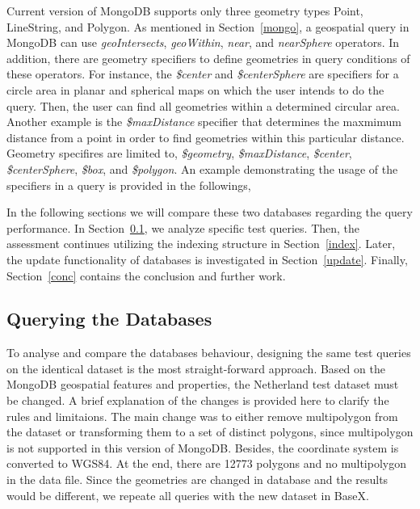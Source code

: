 \documentclass[a4paper,12pt]{article}
\begin{document}
Current version of MongoDB supports only three geometry types Point, LineString, and Polygon. As mentioned in Section~\ref{mongo}, a geospatial query in MongoDB can use \textit{geoIntersects}, \textit{geoWithin}, \textit{near}, and \textit{nearSphere} operators. In addition, there are geometry specifiers to define geometries in query conditions of these operators. For instance, the \textit{\$center} and \textit{\$centerSphere} are specifiers for a circle area in planar and spherical maps on which the user intends to do the query. Then, the user can find all geometries within a determined circular area. Another example is the \textit{\$maxDistance} specifier that determines the maxmimum distance from a point in order to find geometries within this particular distance. Geometry specifires are limited to, \textit{\$geometry}, \textit{\$maxDistance}, \textit{\$center}, \textit{\$centerSphere}, \textit{\$box}, and \textit{\$polygon}. An example demonstrating the usage of the specifiers in a query is provided in the followings,
\vspace{10px}
 \vspace{10px}
 
In the following sections we will compare these two databases regarding the query performance. 
In Section~\ref{s.query}, we analyze specific test queries. Then, the assessment continues
utilizing the indexing structure in Section~\ref{index}. Later, the update functionality of databases is 
investigated in Section~\ref{update}. Finally, Section~\ref{conc} contains the conclusion and further work.

\subsection{Querying the Databases}
\label{s.query}
To analyse and compare the databases behaviour, designing the same test queries on the identical dataset is the most straight-forward approach. Based on the MongoDB geospatial features and properties, the Netherland test dataset must be changed. A brief explanation of the changes is provided here to clarify the rules and limitaions. The main change was to either remove multipolygon from the dataset or transforming them to a set of distinct polygons, since multipolygon is not supported in this version of MongoDB. Besides, the coordinate system is converted to WGS84. At the end, there are 12773 polygons and no multipolygon in the data file. Since the geometries are changed in database and the results would be different, we repeate all queries with the new dataset in BaseX.
\end{document}
